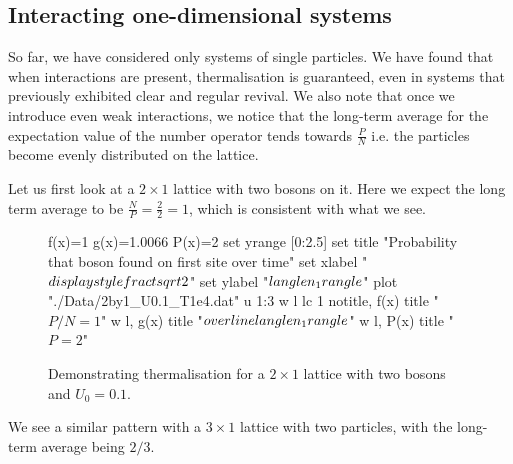 \documentclass[a4paper, 10pt]{article}
\theoremstyle{plain}
\begin{document}
\subsection{Interacting one-dimensional systems}

So far, we have considered only systems of single particles. We have found that
when interactions are present, thermalisation is guaranteed, even in systems
that previously exhibited clear and regular revival.  We also note that once we introduce 
even weak interactions, we notice that the long-term average for the 
expectation value of the number operator tends towards $\frac{P}{N}$ i.e. 
the particles become evenly distributed on the lattice.

Let us first look at a $2\times1$ lattice with two bosons on it. Here we expect 
the long term average to be $\frac{N}{P}=\frac{2}{2}=1$, which is consistent 
with what we see.

\begin{figure}[H]
    \centering
    \begin{gnuplot}[terminal=cairolatex, terminaloptions={lw 2}, scale=0.95]
	f(x)=1
	g(x)=1.0066
	P(x)=2
	set yrange [0:2.5]
        set title "Probability that boson found on first site over time"
        set xlabel "$\\displaystyle \\frac{t}{\\sqrt{2}}$"
        set ylabel "$\\langle n_{1} \\rangle$"
        plot "./Data/2by1_U0.1_T1e4.dat" u 1:3 w l lc 1 notitle, f(x) title "$P/N=1$" w l, g(x) title "$\\overline{\\langle n_{1} \\rangle}$" w l, P(x) title "$P=2$"
     \end{gnuplot}
     \vspace*{-5mm}
     \caption{Demonstrating thermalisation for a $2\times 1$ lattice
     with two bosons and $U_0=0.1$.}
\end{figure}

We see a similar pattern with a $3\times1$ lattice with two particles, with the
long-term average being $2/3$.
 
\end{document}
